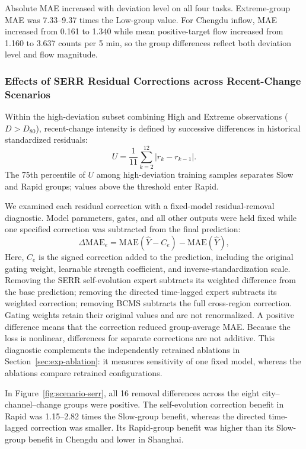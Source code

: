 Absolute MAE increased with deviation level on all four tasks. Extreme-group MAE was 7.33--9.37 times the Low-group value. For Chengdu inflow, MAE increased from 0.161 to 1.340 while mean positive-target flow increased from 1.160 to 3.637 counts per 5 min, so the group differences reflect both deviation level and flow magnitude.

\subsubsection{Effects of SERR Residual Corrections across Recent-Change Scenarios}\label{sec:scenario-serr}

Within the high-deviation subset combining High and Extreme observations (\(D>D_{80}\)), recent-change intensity is defined by successive differences in historical standardized residuals:
\begin{equation}
  U=\frac{1}{11}\sum_{k=2}^{12}|r_k-r_{k-1}|.
  \label{eq:scenario-recent-change}
\end{equation}
The 75th percentile of \(U\) among high-deviation training samples separates Slow and Rapid groups; values above the threshold enter Rapid.

We examined each residual correction with a fixed-model residual-removal diagnostic. Model parameters, gates, and all other outputs were held fixed while one specified correction was subtracted from the final prediction:
\begin{equation}
  \Delta\mathrm{MAE}_{e}
  =\mathrm{MAE}(\widehat Y-C_e)-\mathrm{MAE}(\widehat Y),
  \label{eq:scenario-residual-removal}
\end{equation}
Here, \(C_e\) is the signed correction added to the prediction, including the original gating weight, learnable strength coefficient, and inverse-standardization scale. Removing the SERR self-evolution expert subtracts its weighted difference from the base prediction; removing the directed time-lagged expert subtracts its weighted correction; removing BCMS subtracts the full cross-region correction. Gating weights retain their original values and are not renormalized. A positive difference means that the correction reduced group-average MAE. Because the loss is nonlinear, differences for separate corrections are not additive. This diagnostic complements the independently retrained ablations in Section~\ref{sec:exp-ablation}: it measures sensitivity of one fixed model, whereas the ablations compare retrained configurations.

In Figure~\ref{fig:scenario-serr}, all 16 removal differences across the eight city--channel--change groups were positive. The self-evolution correction benefit in Rapid was 1.15--2.82 times the Slow-group benefit, whereas the directed time-lagged correction was smaller. Its Rapid-group benefit was higher than its Slow-group benefit in Chengdu and lower in Shanghai.

